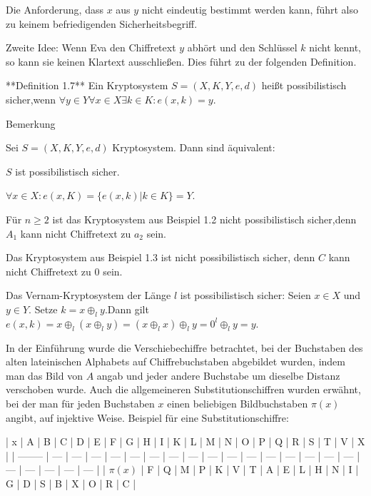 \documentclass[a4paper]{article}
\begin{document}
\begin{multicols}{3}
    Die Anforderung, dass $x$ aus $y$ nicht eindeutig bestimmt werden kann, führt also zu keinem befriedigenden Sicherheitsbegriff.

    Zweite Idee: Wenn Eva den Chiffretext $y$ abhört und den Schlüssel $k$ nicht kennt, so kann sie keinen Klartext ausschließen. Dies führt zu der folgenden Definition.

    **Definition 1.7** Ein Kryptosystem $S=(X,K,Y,e,d)$ heißt possibilistisch sicher,wenn $\forall y\in Y\forall x\in X\exists k\in K:e(x,k)=y$.

    Bemerkung
    \begin{enumerate*}
        \item Sei $S=(X,K,Y,e,d)$ Kryptosystem. Dann sind äquivalent:
        \begin{itemize*}
            \item $S$ ist possibilistisch sicher.
            \item $\forall x\in X:e(x,K)=\{e(x,k)|k\in K\}=Y$.
        \end{itemize*}
        \item  Für $n\geq 2$ ist das Kryptosystem aus Beispiel 1.2 nicht possibilistisch sicher,denn $A_1$ kann nicht Chiffretext zu $a_2$ sein.
        \item  Das Kryptosystem aus Beispiel 1.3 ist nicht possibilistisch sicher, denn $C$ kann nicht Chiffretext zu $0$ sein.
        \item  Das Vernam-Kryptosystem der Länge $l$ ist possibilistisch sicher: Seien $x\in X$ und $y\in Y$. Setze $k=x\oplus_l y$.Dann gilt $e(x,k)=x\oplus_l(x\oplus_l y)=(x\oplus_l x)\oplus_l y= 0^l\oplus_l y=y$.
    \end{enumerate*}

    In der Einführung wurde die Verschiebechiffre betrachtet, bei  der Buchstaben des alten lateinischen Alphabets auf  Chiffrebuchstaben abgebildet wurden, indem man das Bild von $A$ angab und jeder andere Buchstabe um dieselbe Distanz verschoben wurde. Auch die allgemeineren Substitutionschiffren wurden erwähnt, bei der man für jeden Buchstaben $x$ einen beliebigen Bildbuchstaben $\pi(x)$ angibt, auf injektive Weise. Beispiel für eine Substitutionschiffre:

    | x        | A   | B   | C   | D   | E   | F   | G   | H   | I   | K   | L   | M   | N   | O   | P   | Q   | R   | S   | T   | V   | X   |
    | -------- | --- | --- | --- | --- | --- | --- | --- | --- | --- | --- | --- | --- | --- | --- | --- | --- | --- | --- | --- | --- | --- |
    | $\pi(x)$ | F   | Q   | M   | P   | K   | V   | T   | A   | E   | L   | H   | N   | I   | G   | D   | S   | B   | X   | O   | R   | C   |


\end{multicols}
\end{document}
